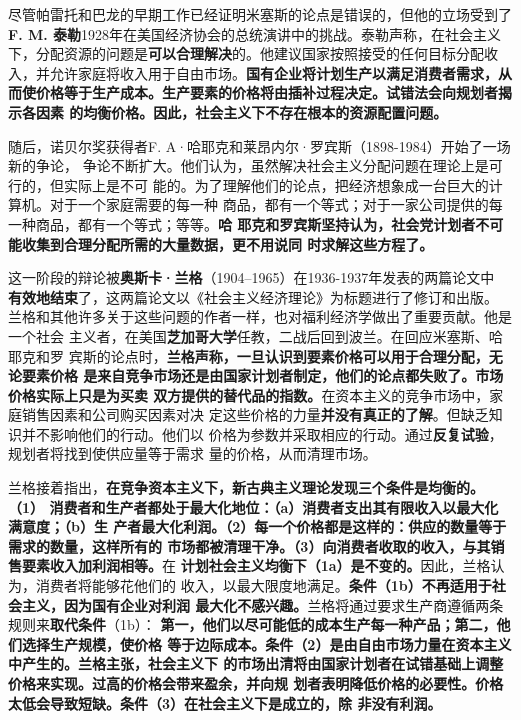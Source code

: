 尽管帕雷托和巴龙的早期工作已经证明米塞斯的论点是错误的，但他的立场受到了
\textbf{F. M. 泰勒}1928年在美国经济协会的总统演讲中的挑战。泰勒声称，在社会主义
下，分配资源的问题是\textbf{可以合理解决}的。他建议国家按照接受的任何目标分配收
入，并允许家庭将收入用于自由市场。\textbf{国有企业将计划生产以满足消费者需求，从
而使价格等于生产成本。生产要素的价格将由插补过程决定。试错法会向规划者揭示各因素
的均衡价格。因此，社会主义下不存在根本的资源配置问题。}

随后，诺贝尔奖获得者F. A·哈耶克和莱昂内尔·罗宾斯（1898-1984）开始了一场新的争论，
争论不断扩大。他们认为，虽然解决社会主义分配问题在理论上是可行的，但实际上是不可
能的。为了理解他们的论点，把经济想象成一台巨大的计算机。对于一个家庭需要的每一种
商品，都有一个等式；对于一家公司提供的每一种商品，都有一个等式；等等。\textbf{哈
耶克和罗宾斯坚持认为，社会党计划者不可能收集到合理分配所需的大量数据，更不用说同
时求解这些方程了。}

这一阶段的辩论被\textbf{奥斯卡·兰格}（1904--1965）在1936-1937年发表的两篇论文中
\textbf{有效地结束}了，这两篇论文以《社会主义经济理论》为标题进行了修订和出版。
兰格和其他许多关于这些问题的作者一样，也对福利经济学做出了重要贡献。他是一个社会
主义者，在美国\textbf{芝加哥大学}任教，二战后回到波兰。在回应米塞斯、哈耶克和罗
宾斯的论点时，\textbf{兰格声称，一旦认识到要素价格可以用于合理分配，无论要素价格
是来自竞争市场还是由国家计划者制定，他们的论点都失败了。市场价格实际上只是为买卖
双方提供的替代品的指数。}在资本主义的竞争市场中，家庭销售因素和公司购买因素对决
定这些价格的力量\textbf{并没有真正的了解}。但缺乏知识并不影响他们的行动。他们以
价格为参数并采取相应的行动。通过\textbf{反复试验}，规划者将找到使供应量等于需求
量的价格，从而清理市场。

兰格接着指出，\textbf{在竞争资本主义下，新古典主义理论发现三个条件是均衡的。（1）
消费者和生产者都处于最大化地位：（a）消费者支出其有限收入以最大化满意度；（b）生
产者最大化利润。（2）每一个价格都是这样的：供应的数量等于需求的数量，这样所有的
市场都被清理干净。（3）向消费者收取的收入，与其销售要素收入加利润相等。}在
\textbf{计划社会主义均衡下（1a）是不变的。}因此，兰格认为，消费者将能够花他们的
收入，以最大限度地满足。\textbf{条件（1b）不再适用于社会主义，因为国有企业对利润
最大化不感兴趣。}兰格将通过要求生产商遵循两条规则来\textbf{取代条件}（1b）：
\textbf{第一，他们以尽可能低的成本生产每一种产品；第二，他们选择生产规模，使价格
等于边际成本。条件（2）是由自由市场力量在资本主义中产生的。兰格主张，社会主义下
的市场出清将由国家计划者在试错基础上调整价格来实现。过高的价格会带来盈余，并向规
划者表明降低价格的必要性。价格太低会导致短缺。条件（3）在社会主义下是成立的，除
非没有利润。}

